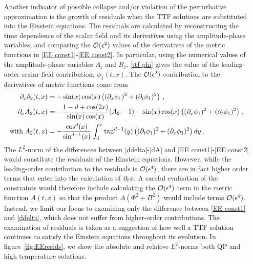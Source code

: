 \documentclass[../PhD.tex]{subfiles}
\begin{document}
Another indicator of possible collapse and/or violation of the perturbative approximation is the growth of residuals when the TTF solutions are substituted into the Einstein equations. The residuals are calculated by reconstructing the time dependence of the scalar field and its derivatives using the amplitude-phase variables, and comparing the $\mathcal O(\epsilon^2)$ values of the derivatives of the metric functions in \eqref{EE const1}-\eqref{EE const2}. In particular, using the numerical values of the amplitude-phase variables $A_j$ and $B_j$, \eqref{ttf phi} gives the value of the leading-order scalar field contribution, $\phi_1(t,x)$. The $\mathcal O(\epsilon^2)$ contribution to the derivatives of metric functions come from
\begin{align}
\label{ddelta}
\partial_x \delta_2(t,x) &= -\sin(x) \cos(x) \left( (\partial_x \phi_1)^2 + (\partial_t \phi_1)^2 \right) \, , \\
\label{dA}
\partial_x A_2(t,x) &= -\frac{1 - d + \cos(2x)}{\sin(x) \cos(x)}(A_2 - 1) - \sin(x) \cos(x) \left( (\partial_x \phi_1)^2 + (\partial_t \phi_1)^2 \right) \, , \\
\text{with} \; A_2(t,x) &= - \frac{\cos^d(x)}{\sin^{d-1}(x)} \int^x_0 \tan^{d-1}(y) \left( (\partial_t \phi_1)^2 + (\partial_x \phi_1)^2 \right) dy \, .
\end{align}
The $L^2$-norm of the differences between \eqref{ddelta}-\eqref{dA} and \eqref{EE const1}-\eqref{EE const2} would constitute the residuals of the Einstein equations. However, while the leading-order contribution to the residuals is $\mathcal O(\epsilon^4)$, there are in fact higher order terms that enter into the calculation of $\partial_t \phi$. A careful evaluation of the constraints would therefore include calculating the $\mathcal O(\epsilon^4)$ term in the metric function $A(t,x)$ so that the product $A ( \Phi^2 + \Pi^2)$ would include terms $\mathcal O(\epsilon^6)$. Instead, we limit our focus to examining only the difference between \eqref{EE const1} and \eqref{ddelta}, which does not suffer from higher-order contributions. The examination of residuals is taken as a suggestion of how well a TTF solution continues to satisfy the Einstein equations throughout its evolution. In figure~\ref{fig:EEresids}, we show the absolute and relative $L^2$-norms both QP and high temperature solutions.
\end{document}
